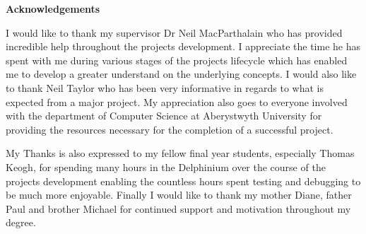 \thispagestyle{empty}

\begin{center}
    {\LARGE\bf Acknowledgements}
\end{center}
I would like to thank my supervisor Dr Neil MacParthalain who has provided incredible help throughout the projects development. I appreciate the time he has spent with me during various stages of the projects lifecycle which has enabled me to develop a greater understand on the underlying concepts. I would also like to thank Neil Taylor who has been very informative in regards to what is expected from a major project. My appreciation also goes to everyone involved with the department of Computer Science at Aberystwyth University for providing the resources necessary for the completion of a successful project.

My Thanks is also expressed to my fellow final year students, especially Thomas Keogh, for spending many hours in the Delphinium over the course of the projects development enabling the countless hours spent testing and debugging to be much more enjoyable. Finally I would like to thank my mother Diane, father Paul and brother Michael for continued support and motivation throughout my degree.